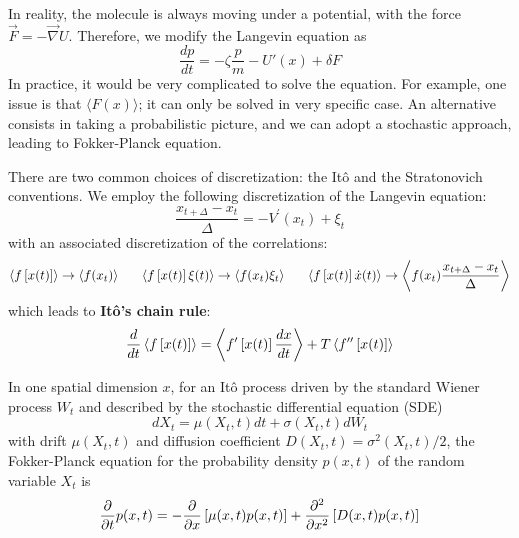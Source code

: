 \documentclass[fleqn,10pt]{InternshipReport_SI-ENS-PSL}
\begin{document}

In reality, the molecule is always moving under a potential, with the force $\vec{F} = - \vec\nabla U$. Therefore, we modify the Langevin equation as
$$ \frac{dp}{dt} = -\zeta \frac{p}{m} - U'(x) + \delta F $$
In practice, it would be very complicated to solve the equation. For example, one issue is that $\langle F(x) \rangle$; it can only be solved in very specific case. An alternative consists in taking a probabilistic picture, and we can adopt a stochastic approach, leading to Fokker-Planck equation.


There are two common choices of discretization: the Itô and the Stratonovich conventions. We employ the following discretization of the Langevin equation:
$$ \frac{x_{t+\Delta} - x_t}{\Delta} = -V^\prime(x_t) + \xi_t $$
with an associated discretization of the correlations:
$$ \left\langle f\left[x(t)\right] \right\rangle \to \left\langle f(x_t) \right\rangle \ \ \ \ \  \left\langle f\left[x(t)\right] \xi(t) \right\rangle \to \left\langle f(x_t)\xi_t \right\rangle \ \ \ \ \  \left\langle f\left[x(t)\right] \dot{x}(t) \right\rangle \to \left\langle f(x_t) \frac{x_{t+\Delta} - x_t}{\Delta} \right\rangle $$
which leads to \textbf{Itô's chain rule}:
$$ \frac{d}{dt} \left\langle f\left[x(t)\right] \right\rangle = \left\langle f^\prime\left[x(t)\right] \frac{dx}{dt} \right\rangle + T \left\langle f^{\prime\prime} \left[ x(t) \right] \right\rangle $$


In one spatial dimension $x$, for an Itô process driven by the standard Wiener process $W_t$ and described by the stochastic differential equation (SDE)
$$ dX_t = \mu(X_t,t) dt + \sigma(X_t,t) dW_t $$
with drift $\mu(X_t,t)$ and diffusion coefficient $D(X_t,t) = \sigma^2(X_t,t)/2$, the Fokker-Planck equation for the probability density $p(x,t)$ of the random variable $X_t$ is
$$ \frac{\partial}{\partial t} p(x,t) = - \frac{\partial}{\partial x} \left[ \mu(x,t) p(x,t) \right] + \pdv[2]{}{x} \left[ D(x,t) p(x,t) \right] $$

\end{document}
